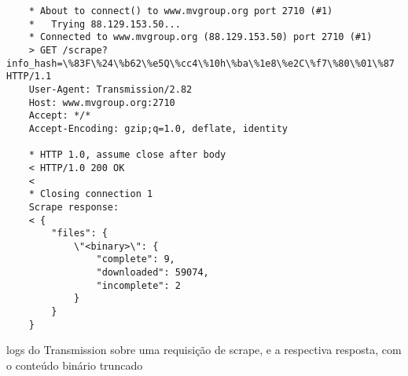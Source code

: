
\begin{listing}[H]
    \begin{verbatim}
    * About to connect() to www.mvgroup.org port 2710 (#1)
    *   Trying 88.129.153.50...
    * Connected to www.mvgroup.org (88.129.153.50) port 2710 (#1)
    > GET /scrape?info_hash=\%83F\%24\%b62\%e5Q\%cc4\%10h\%ba\%1e8\%e2C\%f7\%80\%01\%87 HTTP/1.1
    User-Agent: Transmission/2.82
    Host: www.mvgroup.org:2710
    Accept: */*
    Accept-Encoding: gzip;q=1.0, deflate, identity

    * HTTP 1.0, assume close after body
    < HTTP/1.0 200 OK
    <
    * Closing connection 1
    Scrape response:
    < {
        "files": {
            \"<binary>\": {
                "complete": 9,
                "downloaded": 59074,
                "incomplete": 2
            }
        }
    }
    \end{verbatim}

    \caption{logs do Transmission sobre uma requisição de scrape, e a respectiva
    resposta, com o conteúdo binário truncado}
    \label{lst:scrape}
\end{listing}